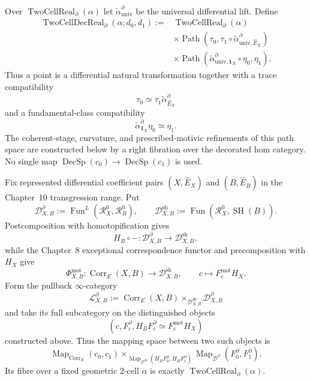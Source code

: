 \begin{definition}
\label{def:prequantum-decorated-two-cell-realization}
Over $\operatorname{TwoCellReal}_{\partial}(\alpha)$ let
$\widetilde\alpha^{\partial}_{\mathrm{univ}}$ be the universal differential lift.
Define
\[
\boxed{
\begin{aligned}
\operatorname{TwoCellDecReal}_{\partial}(\alpha;d_0,d_1)
:={}&
\operatorname{TwoCellReal}_{\partial}(\alpha)
\\
&\times
\operatorname{Path}
\left(
\tau_0,
\tau_1\circ
\widetilde\alpha^{\partial}_{\mathrm{univ},\widehat E_X}
\right)
\\
&\times
\operatorname{Path}
\left(
\widetilde\alpha^{\partial}_{\mathrm{univ},\mathbf1_X}
\circ\eta_0,
\eta_1
\right).
\end{aligned}
}
\]
Thus a point is a differential natural transformation together with a trace
compatibility
\[
\tau_0\simeq
\tau_1\widetilde\alpha^{\partial}_{\widehat E_X}
\]
and a fundamental-class compatibility
\[
\widetilde\alpha^{\partial}_{\mathbf1_X}\eta_0\simeq\eta_1.
\]
The coherent-stage, curvature, and prescribed-motivic refinements of this path
space are constructed below by a right fibration over the decorated hom
category.  No single map
$\operatorname{DecSp}(c_0)\to\operatorname{DecSp}(c_1)$ is used.
\end{definition}

\begin{construction}
\label{constr:prequantum-differential-lift-hom-category}
Fix represented differential coefficient pairs
$(X,\widehat E_X)$ and $(B,\widehat E_B)$ in the Chapter~10 transgression
range.  Put
\[
\mathcal D_{X,B}^{\partial}
:=
\operatorname{Fun}^{L}(\mathcal R_X^0,\mathcal R_B^0),
\qquad
\mathcal D_{X,B}^{\mathrm{sh}}
:=
\operatorname{Fun}(\mathcal R_X^0,\operatorname{SH}(B)).
\]
Postcomposition with homotopification gives
\[
H_B\circ-:\mathcal D_{X,B}^{\partial}\longrightarrow
\mathcal D_{X,B}^{\mathrm{sh}},
\]
while the Chapter~8 exceptional correspondence functor and precomposition with
$H_X$ give
\[
\Phi_{X,B}^{\mathrm{mot}}:
\operatorname{Corr}_E(X,B)\longrightarrow
\mathcal D_{X,B}^{\mathrm{sh}},
\qquad
c\longmapsto F_c^{\mathrm{mot}}H_X.
\]
Form the pullback $\infty$-category
\[
\mathcal L_{X,B}^{\partial}
:=
\operatorname{Corr}_E(X,B)
\times_{\mathcal D_{X,B}^{\mathrm{sh}}}
\mathcal D_{X,B}^{\partial}
\]
and take its full subcategory on the distinguished objects
\[
(c,F_c^{\partial},
  H_BF_c^{\partial}\simeq F_c^{\mathrm{mot}}H_X)
\]
constructed above.  Thus the mapping space between two such objects is
\[
\operatorname{Map}_{\operatorname{Corr}_E}(c_0,c_1)
\times_{
 \operatorname{Map}_{\mathcal D^{\mathrm{sh}}}
 (H_BF_0^{\partial},H_BF_1^{\partial})}
\operatorname{Map}_{\mathcal D^{\partial}}
(F_0^{\partial},F_1^{\partial}).
\]
Its fibre over a fixed geometric $2$-cell $\alpha$ is exactly
$\operatorname{TwoCellReal}_{\partial}(\alpha)$.
\end{construction}

